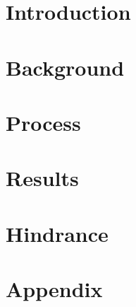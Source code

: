 \documentclass[12]{report}
\begin{document}
\chapter{Introduction}


\chapter{Background}


\chapter{Process}



\chapter{Results}


\chapter{Hindrance}


\appendix
\chapter{Appendix}

\end{document}
